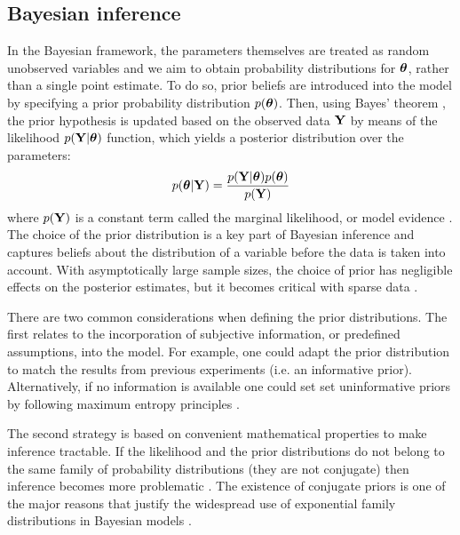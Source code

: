 \subsection{Bayesian inference}  \label{section:bayesian_inference}
In the Bayesian framework, the parameters themselves are treated as random unobserved variables and we aim to obtain probability distributions for $\mbox{\boldmath $\theta$}$, rather than a single point estimate. To do so, prior beliefs are introduced into the model by specifying a prior probability distribution $p(\mbox{\boldmath $\theta$})$. Then, using Bayes' theorem \cite{Bayes1763}, the prior hypothesis is updated based on the observed data ${\bf Y}$ by means of the likelihood $p({\bf Y}|\mbox{\boldmath $\theta$})$ function, which yields a posterior distribution over the parameters:
\[
	p(\mbox{\boldmath $\theta$}|{\bf Y}) = \frac{p({\bf Y}|\mbox{\boldmath $\theta$}) p(\mbox{\boldmath $\theta$})}{p({\bf Y})}
\]
where $p({\bf Y})$ is a constant term called the marginal likelihood, or model evidence \cite{Bishop2006,Murphy}.\\
The choice of the prior distribution is a key part of Bayesian inference and captures beliefs about the distribution of a variable before the data is taken into account. With asymptotically large sample sizes, the choice of prior has negligible effects on the posterior estimates, but it becomes critical with sparse data \cite{Bishop2006,Murphy,Gelman2013}.

There are two common considerations when defining the prior distributions. The first relates to the incorporation of subjective information, or predefined assumptions, into the model. For example, one could adapt the prior distribution to match the results from previous experiments (i.e. an informative prior). Alternatively, if no information is available one could set set uninformative priors by following maximum entropy principles \cite{Jaynes1968}.

The second strategy is based on convenient mathematical properties to make inference tractable. If the likelihood and the prior distributions do not belong to the same family of probability distributions (they are not conjugate) then inference becomes more problematic \cite{Raiffa1961,Bishop2006,Murphy,Gelman2013}. The existence of conjugate priors is one of the major reasons that justify the widespread use of exponential family distributions in Bayesian models \cite{Gelman2013}.

